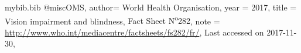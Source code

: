 \RequirePackage{filecontents}
\begin{filecontents}{mybib.bib}
@misc{OMS,
    author= {{World Health Organisation}},
    year  = {2017},
    title = {Vision impairment and blindness, {Fact Sheet N\textsuperscript{o}282}},
    note  = {\url{http://www.who.int/mediacentre/factsheets/fs282/fr/}, 
             Last accessed on 2017-11-30},
}
\end{filecontents}

\documentclass{article}

\usepackage[hyphens,spaces]{url}


\cite{OMS}


